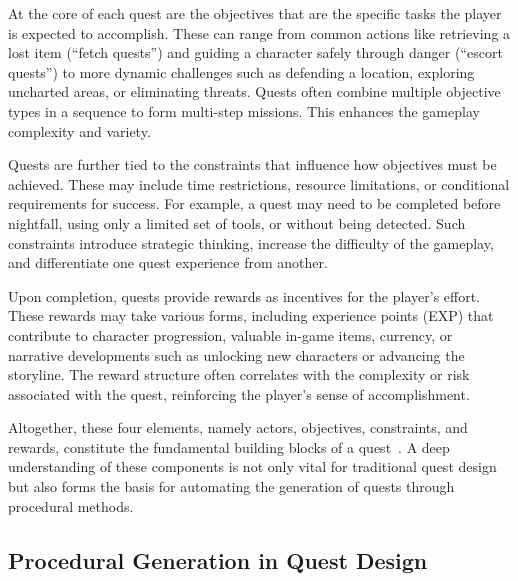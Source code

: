 At the core of each quest are the objectives that are the specific tasks the player is
expected to accomplish. These can range from common actions like retrieving a lost item
(“fetch quests”) and guiding a character safely through danger (“escort quests”) to more
dynamic challenges such as defending a location, exploring uncharted areas, or eliminating
threats. Quests often combine multiple objective types in a sequence to form multi-step
missions. This enhances the gameplay complexity and variety.

Quests are further tied to the constraints that influence how objectives must be
achieved. These may include time restrictions, resource limitations, or conditional requirements
for success. For example, a quest may need to be completed before nightfall,
using only a limited set of tools, or without being detected. Such constraints introduce
strategic thinking, increase the difficulty of the gameplay, and differentiate one quest
experience from another.

Upon completion, quests provide rewards as incentives for the player's effort. These
rewards may take various forms, including experience points (EXP) that contribute to
character progression, valuable in-game items, currency, or narrative developments such as
unlocking new characters or advancing the storyline. The reward structure often correlates
with the complexity or risk associated with the quest, reinforcing the player's sense of
accomplishment.

Altogether, these four elements, namely actors, objectives, constraints, and rewards,
constitute the fundamental building blocks of a quest~\cite{howard2022quests}. A deep understanding of these
components is not only vital for traditional quest design but also forms the basis for
automating the generation of quests through procedural methods.

\subsection{Procedural Generation in Quest Design}

